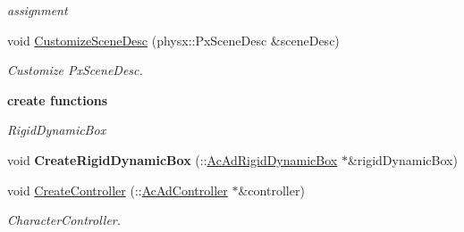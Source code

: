 \begin{DoxyCompactItemize}
\begin{DoxyCompactList}\small\item\em assignment \item\end{DoxyCompactList}\item 
\hypertarget{classContent_1_1SceneAuth_a3eeb833d571491356f38d1e5d3abc7a3}{
void \hyperlink{classContent_1_1SceneAuth_a3eeb833d571491356f38d1e5d3abc7a3}{CustomizeSceneDesc} (physx::PxSceneDesc \&sceneDesc)}
\label{classContent_1_1SceneAuth_a3eeb833d571491356f38d1e5d3abc7a3}

\begin{DoxyCompactList}\small\item\em Customize PxSceneDesc. \item\end{DoxyCompactList}\end{DoxyCompactItemize}
\begin{Indent}{\bf create functions}\par
{\em \label{_amgrp51b34d861ebe0927d3cb889fc3d4b9ff}
 RigidDynamicBox }\begin{DoxyCompactItemize}
\item 
\hypertarget{classContent_1_1SceneAuth_afafd3c42b73b4e8f1437203357b2bc04}{
void {\bfseries CreateRigidDynamicBox} (::\hyperlink{classContent_1_1Actor_1_1Admin_1_1RigidDynamicBox}{AcAdRigidDynamicBox} $\ast$\&rigidDynamicBox)}
\label{classContent_1_1SceneAuth_afafd3c42b73b4e8f1437203357b2bc04}

\item 
\hypertarget{classContent_1_1SceneAuth_a40365cec1b4661dbb74ddda4df6f1e3b}{
void \hyperlink{classContent_1_1SceneAuth_a40365cec1b4661dbb74ddda4df6f1e3b}{CreateController} (::\hyperlink{classContent_1_1Actor_1_1Admin_1_1Controller}{AcAdController} $\ast$\&controller)}
\label{classContent_1_1SceneAuth_a40365cec1b4661dbb74ddda4df6f1e3b}

\begin{DoxyCompactList}\small\item\em CharacterController. \item\end{DoxyCompactList}\end{DoxyCompactItemize}
\end{Indent}
